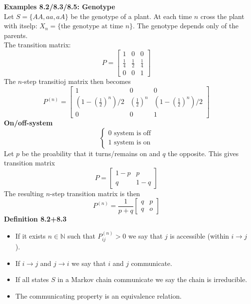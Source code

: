 \documentclass[12pt,a4paper,draft]{report}
\begin{document}
\textbf{Examples 8.2/8.3/8.5: Genotype}\\
Let $S=\{AA,aa,aA\}$ be the genotype of a plant. At each time $n$ cross the plant with itselp: $X_n=\{\text{the genotype at time }n\}$. The genotype depends only of the parents.\\
The transition matrix:
\begin{equation}
P=\begin{bmatrix}
1 & 0 & 0\\
\frac{1}{4} & \frac{1}{2} & \frac{1}{4}\\
0 & 0 & 1
\end{bmatrix}
\end{equation}
The $n$-step transitioj matrix then becomes
\begin{equation}
P^{(n)}=\begin{bmatrix}
1 & 0 & 0\\
\left(1-\left(\frac{1}{2}\right)^n\right)/2 & \left(\frac{1}{2}\right)^n & \left(1-\left(\frac{1}{2}\right)^n\right)/2\\
0 & 0 & 1
\end{bmatrix}
\end{equation}
\textbf{On/off-system}\\
\begin{equation}
\begin{cases}
0\text{ system is off}\\
1\text{ system is on}
\end{cases}
\end{equation}
Let $p$ be the proability that it turns/remains on and $q$ the opposite. This gives transition matrix
\begin{equation}
P=\begin{bmatrix}
1-p & p\\
q & 1-q
\end{bmatrix}
\end{equation}
The resulting $n$-step transition matrix is then
\begin{equation}
P^{(n)}=\frac{1}{p+q}\begin{bmatrix}
q & p\\
q & o
\end{bmatrix}
\end{equation}
\textbf{Definition 8.2+8.3}
\begin{itemize}
\setlength\itemsep{0em}
\item If it exists $n\in\mathbb{N}$ such that $P^{(n)}_{ij}>0$ we say that $j$ is accessible (within $i\to j$). 
\item If $i\to j$ and $j\to i$ we say that $i$ and $j$ communicate.
\item If all states $S$ in a Markov chain communicate we say the chain is irreducible.
\item The communicating property is an equivalence relation.
\end{itemize}
\end{document}
